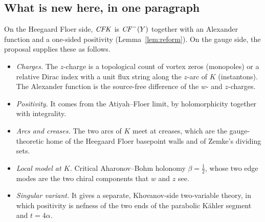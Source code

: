 \subsection{What is new here, in one paragraph}
On the Heegaard Floer side, $\mathit{CFK}$ is $\mathit{CF}^-(Y)$ together with an Alexander function and a one-sided positivity
(Lemma~\ref{lem:reform}).  On the gauge side, the proposal supplies these as follows.
\begin{itemize}[leftmargin=2em]
\item \emph{Charges.}  The $z$-charge is a topological count of vortex zeros (monopoles) or a relative Dirac index with a
unit flux string along the $z$-arc of $K$ (instantons).  The Alexander function is the source-free difference of the
$w$- and $z$-charges.
\item \emph{Positivity.}  It comes from the Atiyah--Floer limit, by holomorphicity together with integrality.
\item \emph{Arcs and creases.}  The two arcs of $K$ meet at creases, which are the gauge-theoretic home of the Heegaard
Floer basepoint walls and of Zemke's dividing sets.
\item \emph{Local model at $K$.}  Critical Aharonov--Bohm holonomy $\beta=\frac12$, whose two edge modes are the two chiral
components that $w$ and $z$ see.
\item \emph{Singular variant.}  It gives a separate, Khovanov-side two-variable theory, in which positivity is nefness of
the two ends of the parabolic Kähler segment and $t=4\alpha$.
\end{itemize}
